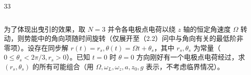 \begin{problem}[2026年博知汇BWPhO][旋转电场的曳引]{33}
\begin{subproblem}
\begin{subsubproblem}
\begin{equation}
            \end{equation}
        \end{subsubproblem}
        \begin{subsubproblem}
            为了体现出曳引的效果，取 $N = 3$ 并令各电极点电荷以绕 $z$ 轴的恒定角速度 $\Omega$ 转动，则势能中的角向项随时间旋转（仅展开至（2.2）问中与角向有关的最低阶非零项）。设存在同步解 $r(t) = r_s, \theta(t) = \Omega t + \theta_s$，其中 $r_s, \theta_s$ 为常量（$0 \leq \theta_s < 2\pi/3, r_s > 0$）。已知 $t = 0$ 时 $\theta = 0$ 方向刚好有一个电极点电荷经过，求 $(r_s, \theta_s)$ 的所有可能组合（用 $\Omega, \omega_L, \omega_z, a, z_0, g$ 表示，不考虑临界情况）。
        \end{subsubproblem}
    \end{subproblem}
\end{problem}
